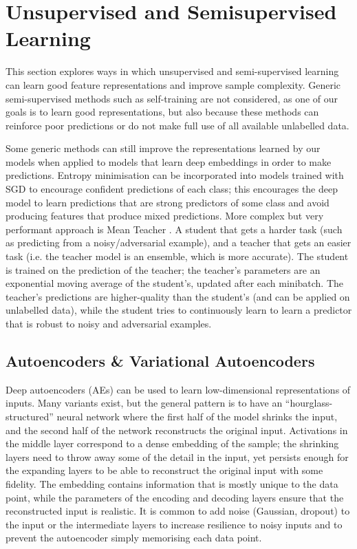 \section{Unsupervised and Semisupervised Learning}
\label{unsup}

This section explores ways in which unsupervised and semi-supervised learning can learn good feature representations and improve sample complexity.
Generic semi-supervised methods such as self-training are not considered, as one of our goals is to learn good representations, but also because these methods can reinforce poor predictions or do not make full use of all available unlabelled data.

Some generic methods can still improve the representations learned by our models when applied to models that learn deep embeddings in order to make predictions.
Entropy minimisation \cite{entropy_min} can be incorporated into models trained with SGD to encourage confident predictions of each class; this encourages the deep model to learn predictions that are strong predictors of some class and avoid producing features that produce mixed predictions.
More complex but very performant approach is Mean Teacher \cite{mean_teacher}. A student that gets a harder task (such as predicting from a noisy/adversarial example), and a teacher that gets an easier task (i.e. the teacher model is an ensemble, which is more accurate).
The student is trained on the prediction of the teacher; the teacher's parameters are an exponential moving average of the student's, updated after each minibatch.
The teacher's predictions are higher-quality than the student's (and can be applied on unlabelled data), while the student tries to continuously learn to learn a predictor that is robust to noisy and adversarial examples.

\subsection{Autoencoders \& Variational Autoencoders}

Deep autoencoders (AEs) can be used to learn low-dimensional representations of inputs.
Many variants exist,  but  the general pattern is to have an ``hourglass-structured'' neural network where the first half of the model shrinks the input, and the second half of the network reconstructs the original input.
Activations in the middle layer correspond to a dense embedding of the sample;  the shrinking layers need to  throw away some of the detail in the input, yet persists enough for the expanding layers to be able to reconstruct the original input with some fidelity.
The embedding contains information that is mostly unique to the data point, while the parameters of the encoding and decoding layers ensure that the reconstructed input is realistic.
It is common to add noise (Gaussian, dropout) to the input or the intermediate layers to increase resilience to noisy inputs and to prevent the autoencoder simply memorising each data point.

